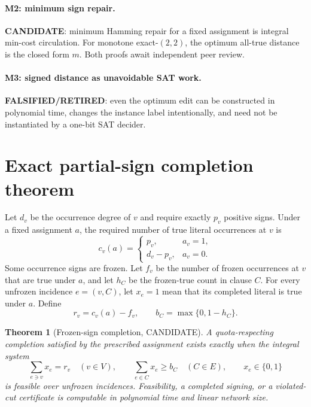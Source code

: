 \documentclass[11pt]{article}
\newtheorem{theorem}{Theorem}
\begin{document}
\paragraph{M2: minimum sign repair.}
\textbf{CANDIDATE}: minimum Hamming repair for a fixed assignment is integral
min-cost circulation.  For monotone exact-$(2,2)$, the optimum all-true distance is the
closed form $m$.  Both proofs await independent peer review.

\paragraph{M3: signed distance as unavoidable SAT work.}
\textbf{FALSIFIED/RETIRED}: even the optimum edit can be constructed in polynomial time,
changes the instance label intentionally, and need not be instantiated by a one-bit SAT
decider.

\section{Exact partial-sign completion theorem}

Let $d_v$ be the occurrence degree of $v$ and require exactly $p_v$ positive signs.
Under a fixed assignment $a$, the required number of true literal occurrences at $v$ is
\[
c_v(a)=\begin{cases}p_v,&a_v=1,\\d_v-p_v,&a_v=0.\end{cases}
\]
Some occurrence signs are frozen.  Let $f_v$ be the number of frozen occurrences at $v$
that are true under $a$, and let $h_C$ be the frozen-true count in clause $C$.  For every
unfrozen incidence $e=(v,C)$, let $x_e=1$ mean that its completed literal is true under
$a$.  Define
\[
r_v=c_v(a)-f_v,
\qquad
b_C=\max\{0,1-h_C\}.
\]

\begin{theorem}[Frozen-sign completion, CANDIDATE]
A quota-respecting completion satisfied by the prescribed assignment exists exactly when
the integral system
\[
\sum_{e\ni v}x_e=r_v\quad(v\in V),
\qquad
\sum_{e\in C}x_e\ge b_C\quad(C\in E),
\qquad x_e\in\{0,1\}
\tag{1}
\]
is feasible over unfrozen incidences.  Feasibility, a completed signing, or a violated-cut
certificate is computable in polynomial time and linear network size.
\end{theorem}
\end{document}
